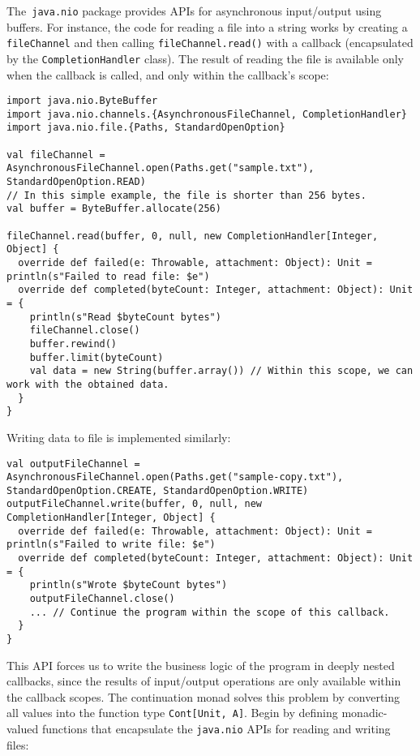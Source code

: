 The\lstinline! java.nio! package provides APIs for asynchronous input/output
using buffers. For instance, the code for reading a file into a string
works by creating a \lstinline!fileChannel! and then calling \lstinline!fileChannel.read()!
with a callback (encapsulated by the \lstinline!CompletionHandler!
class). The result of reading the file is available only when the
callback is called, and only within the callback\textsf{'}s scope:
\begin{lstlisting}
import java.nio.ByteBuffer
import java.nio.channels.{AsynchronousFileChannel, CompletionHandler}
import java.nio.file.{Paths, StandardOpenOption}

val fileChannel = AsynchronousFileChannel.open(Paths.get("sample.txt"), StandardOpenOption.READ)
// In this simple example, the file is shorter than 256 bytes.
val buffer = ByteBuffer.allocate(256)

fileChannel.read(buffer, 0, null, new CompletionHandler[Integer, Object] {
  override def failed(e: Throwable, attachment: Object): Unit = println(s"Failed to read file: $e")
  override def completed(byteCount: Integer, attachment: Object): Unit = {
    println(s"Read $byteCount bytes")
    fileChannel.close()
    buffer.rewind()
    buffer.limit(byteCount)
    val data = new String(buffer.array()) // Within this scope, we can work with the obtained data.
  }
}
\end{lstlisting}
Writing data to file is implemented similarly:
\begin{lstlisting}
val outputFileChannel = AsynchronousFileChannel.open(Paths.get("sample-copy.txt"), StandardOpenOption.CREATE, StandardOpenOption.WRITE)
outputFileChannel.write(buffer, 0, null, new CompletionHandler[Integer, Object] {
  override def failed(e: Throwable, attachment: Object): Unit = println(s"Failed to write file: $e")
  override def completed(byteCount: Integer, attachment: Object): Unit = {
    println(s"Wrote $byteCount bytes")
    outputFileChannel.close()
    ... // Continue the program within the scope of this callback.
  }
}
\end{lstlisting}
This API forces us to write the business logic of the program in deeply
nested callbacks, since the results of input/output operations are
only available within the callback scopes. The continuation monad
solves this problem by converting all values into the function type
\lstinline!Cont[Unit, A]!. Begin by defining monadic-valued functions
that encapsulate the \lstinline!java.nio! APIs for reading and writing
files:
